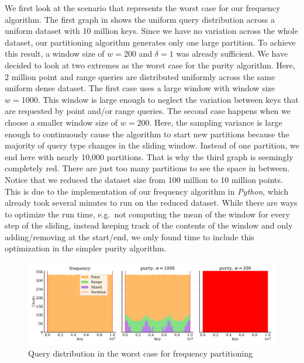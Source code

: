 \noindent We first look at the scenario that represents the worst case for our frequency algorithm. The first graph in  shows the uniform query distribution across a uniform dataset with 10 million keys. Since we have no variation across the whole dataset, our partitioning algorithm generates only one large partition. To achieve this result, a window size of $w = 200$ and $\delta = 1$ was already sufficient. We have decided to look at two extremes as the worst case for the purity algorithm. Here, 2 million point and range queries are distributed uniformly across the same uniform dense dataset. The first case uses a large window with window size $w = 1000$. This window is large enough to neglect the variation between keys that are requested by point and/or range queries. The second case happens when we choose a smaller window size of $w = 200$. Here, the sampling variance is large enough to continuously cause the algorithm to start new partitions because the majority of query type changes in the sliding window. Instead of one partition, we end here with nearly 10,000 partitions. That is why the third graph is seemingly completely red. There are just too many partitions to see the space in between. Notice that we reduced the dataset size from 100 million to 10 million points. This is due to the implementation of our frequency algorithm in \textit{Python}, which already took several minutes to run on the reduced dataset. While there are ways to optimize the run time, e.g.~not computing the mean of the window for every step of the sliding, instead keeping track of the contents of the window and only adding/removing at the start/end, we only found time to include this optimization in the simpler purity algorithm. 

\begin{figure}
    \centering
    \includegraphics[width=\textwidth]{figures/exp3_query_dist.pdf}
    \caption[Worst case query distributions for partitioning]{Query distribution in the worst case for frequency partitioning}
    \label{fig:freqworst}
\end{figure}


